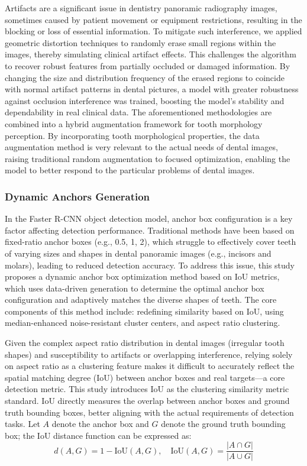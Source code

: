 \documentclass[pdflatex,sn-mathphys-num]{sn-jnl}%
\theoremstyle{thmstyleone}%
\theoremstyle{thmstyletwo}%
\theoremstyle{thmstylethree}%
\begin{document}
 Artifacts are a significant issue in dentistry panoramic radiography images, sometimes caused by patient movement or equipment restrictions, resulting in the blocking or loss of essential information.  To mitigate such interference, we applied geometric distortion techniques to randomly erase small regions within the images, thereby simulating clinical artifact effects. This challenges the algorithm to recover robust features from partially occluded or damaged information.  By changing the size and distribution frequency of the erased regions to coincide with normal artifact patterns in dental pictures, a model with greater robustness against occlusion interference was trained, boosting the model's stability and dependability in real clinical data.  The aforementioned methodologies are combined into a hybrid augmentation framework for tooth morphology perception.  By incorporating tooth morphological properties, the data augmentation method is very relevant to the actual needs of dental images, raising traditional random augmentation to focused optimization, enabling the model to better respond to the particular problems of dental images.

\subsubsection{Dynamic Anchors Generation}

In the Faster R-CNN object detection model, anchor box configuration is a key factor affecting detection performance. Traditional methods have been based on fixed-ratio anchor boxes (e.g., 0.5, 1, 2), which struggle to effectively cover teeth of varying sizes and shapes in dental panoramic images (e.g., incisors and molars), leading to reduced detection accuracy. To address this issue, this study proposes a dynamic anchor box optimization method based on IoU metrics, which uses data-driven generation to determine the optimal anchor box configuration and adaptively matches the diverse shapes of teeth. The core components of this method include: redefining similarity based on IoU, using median-enhanced noise-resistant cluster centers, and aspect ratio clustering.

Given the complex aspect ratio distribution in dental images (irregular tooth shapes) and susceptibility to artifacts or overlapping interference, relying solely on aspect ratio as a clustering feature makes it difficult to accurately reflect the spatial matching degree (IoU) between anchor boxes and real targets—a core detection metric. This study introduces IoU as the clustering similarity metric standard. IoU directly measures the overlap between anchor boxes and ground truth bounding boxes, better aligning with the actual requirements of detection tasks. Let \(A\) denote the anchor box and \(G\) denote the ground truth bounding box; the IoU distance function can be expressed as:  
\begin{equation}
d(A,G)=1-\text{IoU}(A,G), \quad \text{IoU}(A,G)=\frac{|A \cap G|}{|A \cup G|}
\end{equation}
\end{document}
